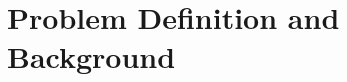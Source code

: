 \documentclass{article}
\begin{document}



\section{Problem Definition and Background}




\end{document}
